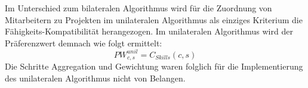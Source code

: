 Im Unterschied zum bilateralen Algorithmus wird für die Zuordnung von Mitarbeitern zu Projekten im unilateralen Algorithmus als einziges Kriterium die Fähigkeits-Kompatibilität herangezogen.
Im unilateralen Algorithmus wird der Präferenzwert demnach wie folgt ermittelt:
\begin{equation}\label{methodik:eq:8}
    PW_{c,s}^{unil} = C_{Skills}(c,s)
\end{equation}
Die Schritte Aggregation und Gewichtung waren folglich für die Implementierung des unilateralen Algorithmus nicht von Belangen.





